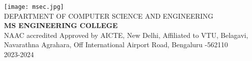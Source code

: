 \documentclass[12pt, a4paper]{report} %
\begin{document}
\begin{titlepage}
\begin{center}
			\vspace{0.2in}
			
			\texttt{[image: msec.jpg]}\\
			\vspace{0.01in}
			{\small DEPARTMENT OF COMPUTER SCIENCE AND ENGINEERING}\\
			\vspace{0.1in}
			\textbf{MS ENGINEERING COLLEGE}\\
			{\small NAAC accredited Approved by AICTE, New Delhi, Affiliated to VTU, Belagavi, Navarathna 
              Agrahara, Off International Airport Road, Bengaluru -562110}\\
			\vspace{0.1in}
			{\small 2023-2024}\\
			
		\end{center} %
	\end{titlepage} %
	
\end{document}
